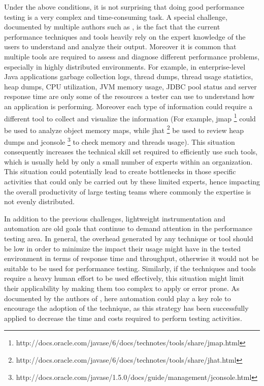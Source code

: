 \documentclass[runningheads,a4paper]{llncs}
\begin{document}
Under the above conditions, it is not surprising that doing good performance
testing is a very complex and time-consuming task. A special challenge, documented by 
multiple authors such as \cite{Woodside2007,trevor1,Angelopoulos2012}, is the
fact that the current performance techniques and tools heavily rely on the expert knowledge of the
users to understand and analyze their output. Moreover it is common that
multiple tools are required to assess and diagnose different performance
problems, especially in highly distributed environments. For example, in
enterprise-level Java applications garbage collection logs, thread dumps, 
thread usage statistics, heap dumps, CPU utilization, JVM memory usage, 
JDBC pool status and server response time are only some of the resources a
tester can use to understand how an application is performing. Moreover each
type of information could require a different tool to collect and visualize the
information (For example, jmap
\footnote{http://docs.oracle.com/javase/6/docs/technotes/tools/share/jmap.html}
could be used to analyze object memory maps, while jhat
\footnote{http://docs.oracle.com/javase/6/docs/technotes/tools/share/jhat.html}
be used to review heap dumps and jconsole
\footnote{http://docs.oracle.com/javase/1.5.0/docs/guide/management/jconsole.html}
to check memory and threads usage). This situation consequently increases the
technical skill set required to efficiently use such tools, which is usually held by only a small number of experts within an organization.
This situation could potentially lead to create bottlenecks in those specific
activities that could only be carried out by these limited experts, hence
impacting the overall productivity of large testing teams where commonly the
expertise is not evenly distributed.

In addition to the previous challenges, lightweight instrumentation and
automation are old goals that continue to demand attention in the performance
testing area. In general, the overhead generated by any technique or tool
should be low in order to minimize the impact their usage might have in the
tested environment in terms of response time and throughput, otherwise it would not be
suitable to be used for performance testing. Similarly, if the techniques and
tools require a heavy human effort to be used effectively, this situation might limit 
their applicability by making them too complex to apply or error prone. As
documented by the authors of \cite{Shahamiri1}, here automation could play a key
role to encourage the adoption of the technique, as this strategy has been
successfully applied to decrease the time and costs required to perform
testing activities.
\end{document}

